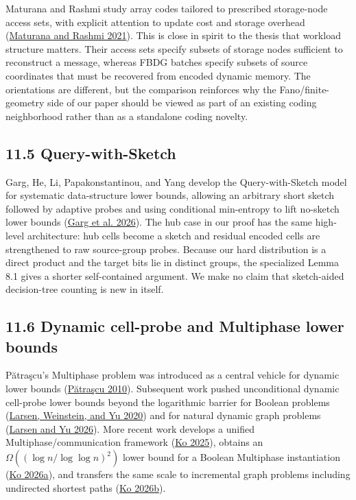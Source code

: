 \documentclass[
]{article}
\begin{document}
Maturana and Rashmi study array codes tailored to prescribed
storage-node access sets, with explicit attention to update cost and
storage overhead (\protect\hyperlink{ref-maturana2021arbitrary}{Maturana
and Rashmi 2021}). This is close in spirit to the thesis that workload
structure matters. Their access sets specify subsets of storage nodes
sufficient to reconstruct a message, whereas FBDG batches specify
subsets of source coordinates that must be recovered from encoded
dynamic memory. The orientations are different, but the comparison
reinforces why the Fano/finite-geometry side of our paper should be
viewed as part of an existing coding neighborhood rather than as a
standalone coding novelty.

\hypertarget{query-with-sketch}{%
\subsection{11.5 Query-with-Sketch}\label{query-with-sketch}}

Garg, He, Li, Papakonstantinou, and Yang develop the Query-with-Sketch
model for systematic data-structure lower bounds, allowing an arbitrary
short sketch followed by adaptive probes and using conditional
min-entropy to lift no-sketch lower bounds
(\protect\hyperlink{ref-garg2026qws}{Garg et al. 2026}). The hub case in
our proof has the same high-level architecture: hub cells become a
sketch and residual encoded cells are strengthened to raw source-group
probes. Because our hard distribution is a direct product and the target
bits lie in distinct groups, the specialized Lemma 8.1 gives a shorter
self-contained argument. We make no claim that sketch-aided
decision-tree counting is new in itself.

\hypertarget{dynamic-cell-probe-and-multiphase-lower-bounds}{%
\subsection{11.6 Dynamic cell-probe and Multiphase lower
bounds}\label{dynamic-cell-probe-and-multiphase-lower-bounds}}

Pătraşcu's Multiphase problem was introduced as a central vehicle for
dynamic lower bounds
(\protect\hyperlink{ref-patrascu2010multiphase}{Pătraşcu 2010}).
Subsequent work pushed unconditional dynamic cell-probe lower bounds
beyond the logarithmic barrier for Boolean problems
(\protect\hyperlink{ref-larsen2020boolean}{Larsen, Weinstein, and Yu
2020}) and for natural dynamic graph problems
(\protect\hyperlink{ref-larsen2026dynamicgraphs}{Larsen and Yu 2026}).
More recent work develops a unified Multiphase/communication framework
(\protect\hyperlink{ref-ko2025landscape}{Ko 2025}), obtains an
\(\Omega((\log n/\log\log n)^2)\) lower bound for a Boolean Multiphase
instantiation (\protect\hyperlink{ref-ko2026boolean}{Ko 2026a}), and
transfers the same scale to incremental graph problems including
undirected shortest paths
(\protect\hyperlink{ref-ko2026dynamicgraphs}{Ko 2026b}).
\end{document}
